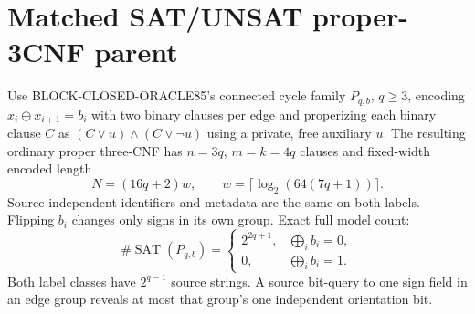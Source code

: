 \documentclass[11pt]{article}
\begin{document}
\section{Matched SAT/UNSAT proper-3CNF parent}
Use BLOCK-CLOSED-ORACLE85's connected cycle family $P_{q,b}$, $q\ge3$, encoding $x_i\oplus x_{i+1}=b_i$ with two binary clauses per edge and properizing each binary clause $C$ as $(C\vee u)\wedge(C\vee\neg u)$ using a private, free auxiliary $u$. The resulting ordinary proper three-CNF has $n=3q$, $m=k=4q$ clauses and fixed-width encoded length
\[
N=(16q+2)w,\qquad w=\lceil\log_2(64(7q+1))\rceil.
\]
Source-independent identifiers and metadata are the same on both labels. Flipping $b_i$ changes only signs in its own group. Exact full model count:
\[
\#\operatorname{SAT}(P_{q,b})=
\begin{cases}2^{2q+1},&\bigoplus_i b_i=0,\\0,&\bigoplus_i b_i=1.\end{cases}
\]
Both label classes have $2^{q-1}$ source strings. A source bit-query to one sign field in an edge group reveals at most that group's one independent orientation bit.
\end{document}

